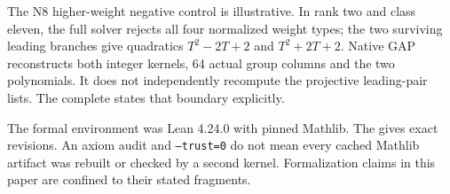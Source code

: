 The N8 higher-weight negative control is illustrative. In rank two and
class eleven, the full solver rejects all four normalized weight types;
the two surviving leading branches give quadratics $T^2-2T+2$ and
$T^2+2T+2$. Native GAP reconstructs both integer kernels, 64 actual
group columns and the two polynomials. It does not independently
recompute the projective leading-pair lists. The complete
 states
that boundary explicitly.

The formal environment was Lean 4.24.0 with pinned Mathlib. The
 gives exact revisions.
An axiom audit and \texttt{--trust=0} do not mean every cached Mathlib
artifact was rebuilt or checked by a second kernel. Formalization
claims in this paper are confined to their stated fragments.
